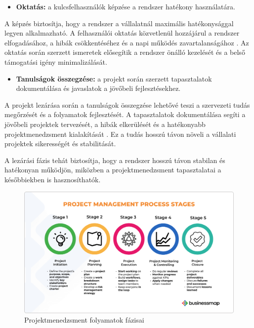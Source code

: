 \begin{itemize}
    \item \textbf{Oktatás:} a kulcsfelhasználók képzése a rendszer hatékony használatára.
\end{itemize}

A képzés biztosítja, hogy a rendszer a vállalatnál maximális hatékonysággal legyen alkalmazható. 
A felhasználói oktatás közvetlenül hozzájárul a rendszer elfogadásához, 
a hibák csökkentéséhez és a napi működés zavartalanságához \cite{Szalay2018,Kovacs2016}. 
Az oktatás során szerzett ismeretek elősegítik a rendszer önálló kezelését és a belső támogatási igény minimalizálását.

\begin{itemize}
    \item \textbf{Tanulságok összegzése:} a projekt során szerzett tapasztalatok dokumentálása és javaslatok a jövőbeli fejlesztésekhez.
\end{itemize}

A projekt lezárása során a tanulságok összegzése lehetővé teszi a szervezeti tudás megőrzését és a folyamatok fejlesztését. 
A tapasztalatok dokumentálása segíti a jövőbeli projektek tervezését, a hibák elkerülését 
és a hatékonyabb projektmenedzsment kialakítását \cite{Hajdu2014,Szalay2018,Kaposi2019}. 
Ez a tudás hosszú távon növeli a vállalati projektek sikerességét és stabilitását.

A lezárási fázis tehát biztosítja, hogy a rendszer hosszú távon stabilan és hatékonyan működjön, 
miközben a projektmenedzsment tapasztalatai a későbbiekben is hasznosíthatók.

\begin{figure}[H]
    \centering
    \includegraphics[width=130mm, keepaspectratio]{figures/project_management_process_stages.png}
    \caption{Projektmenedzsment folyamatok fázisai}
    \label{fig:project_management_process_stages}
\end{figure}
